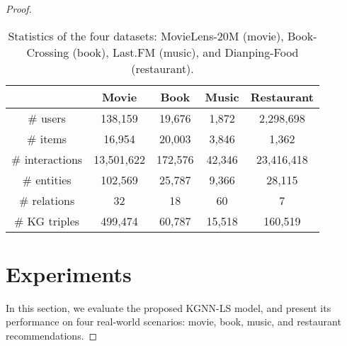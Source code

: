 \documentclass[sigconf]{acmart}
\begin{document}
\begin{proof}
	\begin{table}[t]
			\centering
			\begin{tabular}{c|cccc}
				\hline
				& Movie & Book & Music & Restaurant\\
				\hline
				\# users & 138,159 & 19,676 & 1,872 & 2,298,698\\
				\# items & 16,954 & 20,003 & 3,846 & 1,362\\
				\# interactions & 13,501,622 & 172,576 & 42,346 & 23,416,418\\
				\# entities & 102,569 & 25,787 & 9,366 & 28,115\\
				\# relations & 32 & 18 & 60 & 7\\
				\# KG triples & 499,474 & 60,787 & 15,518 & 160,519\\
				\hline
			\end{tabular}
			\vspace{0.05in}
			\caption{Statistics of the four datasets: MovieLens-20M (movie), Book-Crossing (book), Last.FM (music), and Dianping-Food (restaurant).}
			\label{table:statistics}
			\vspace{-0.2in}
		\end{table}

			
\section{Experiments}
	In this section, we evaluate the proposed KGNN-LS model, and present its performance on four real-world scenarios: movie, book, music, and restaurant recommendations.
	

\end{proof}
\end{document}
